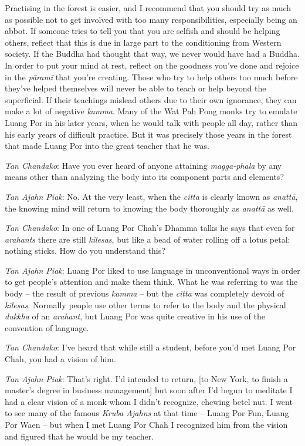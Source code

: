 Practising in the forest is easier, and I
recommend that you should try as much as possible not to get involved
with too many responsibilities, especially being an abbot. If someone
tries to tell you that you are selfish and should be helping others, 
reflect that this is due in large part to the conditioning from Western
society. If the Buddha had thought that way, we never would have had a
Buddha. In order to put your mind at rest, reflect on the goodness
you've done and rejoice in the \emph{pāramī} that you're creating. Those
who try to help others too much before they've helped themselves will
never be able to teach or help beyond the superficial. If their
teachings mislead others due to their own ignorance, they can make a lot
of negative \emph{kamma}. Many of the Wat Pah Pong monks try to emulate
Luang Por in his later years, when he would talk with people all day, 
rather than his early years of difficult practice. But it was precisely
those years in the forest that made Luang Por into the great teacher
that he was. 

\emph{Tan Chandako}: Have you ever heard of anyone attaining
\emph{magga-phala} by any means other than analyzing the body into its
component parts and elements? 

\emph{Tan Ajahn Piak}: No. At the very least, when the \emph{citta} is
clearly known as \emph{anattā}, the knowing mind will return to knowing
the body thoroughly as \emph{anattā} as well. 

\emph{Tan Chandako}: In one of Luang Por Chah's Dhamma talks he says
that even for \emph{arahants} there are still \emph{kilesas}, but like a
bead of water rolling off a lotus petal: nothing sticks. How do you
understand this? 

\emph{Tan Ajahn Piak}: Luang Por liked to use language in unconventional
ways in order to get people's attention and make them think. What he was
referring to was the body -- the result of previous \emph{kamma} --
but the \emph{citta} was completely devoid of \emph{kilesas}. Normally
people use other terms to refer to the body and the physical
\emph{dukkha} of an \emph{arahant}, but Luang Por was quite creative in
his use of the convention of language. 

\emph{Tan Chandako}: I've heard that while still a student, before you'd
met Luang Por Chah, you had a vision of him. 

\emph{Tan Ajahn Piak}: That's right. I'd intended to return, [to New
York, to finish a master's degree in business management] but soon
after I'd begun to meditate I had a clear vision of a monk whom I didn't
recognize, chewing betel nut. I went to see many of the famous
\emph{Kruba Ajahns} at that time -- Luang Por Fun, Luang Por Waen --
but when I met Luang Por Chah I recognized him from the vision and
figured that he would be my teacher. 

